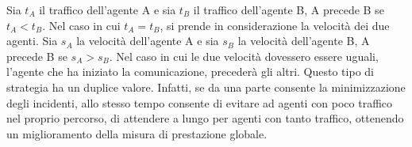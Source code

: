 \documentclass[a4paper,10pt]{article}
\begin{document}
    Sia $t_A$ il traffico dell'agente A e sia $t_B$ il traffico dell'agente B, A
    precede B se $t_A < t_B$. Nel caso in cui $t_A = t_B$, si prende in considerazione la velocità dei
    due agenti. Sia $s_A$ la velocità dell'agente A e sia $s_B$ la velocità
    dell'agente B, A precede B se $s_A > s_B$. Nel caso in cui le due velocità dovessero essere 
    uguali, l'agente che ha iniziato la comunicazione, precederà gli altri.  
    Questo tipo di strategia ha un duplice valore. Infatti, se da una
    parte consente la minimizzazione degli incidenti, allo stesso tempo consente
    di evitare ad agenti con poco traffico nel proprio percorso, di attendere a 
    lungo per agenti con tanto traffico, ottenendo un miglioramento della misura
    di prestazione globale.
    
\end{document}
